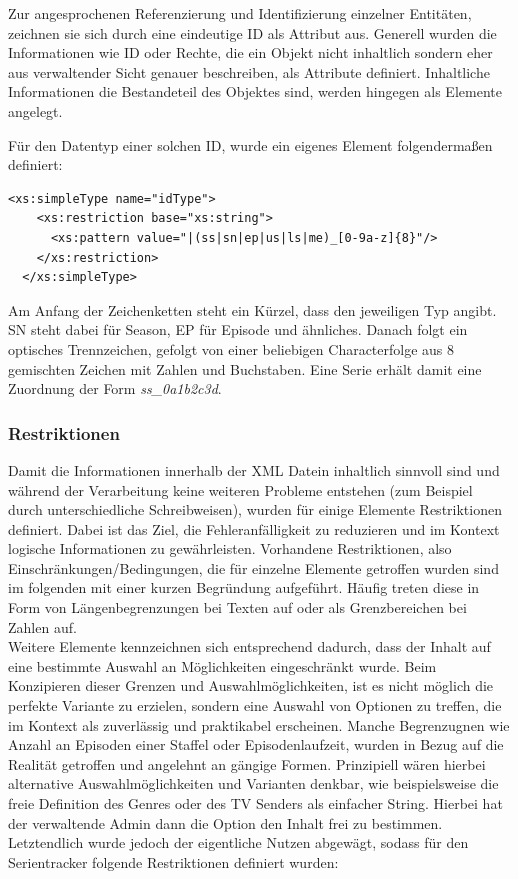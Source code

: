 \parskip 12pt
\parindent 0pt
Zur angesprochenen Referenzierung und Identifizierung einzelner Entitäten, zeichnen sie sich durch eine eindeutige ID als Attribut aus. Generell wurden die Informationen wie ID oder Rechte, die ein Objekt nicht inhaltlich sondern eher aus verwaltender Sicht genauer beschreiben, als Attribute definiert. Inhaltliche Informationen die Bestandeteil des Objektes sind, werden hingegen als Elemente angelegt.

Für den Datentyp einer solchen ID, wurde ein eigenes Element folgendermaßen definiert:
\begin{lstlisting}[label=xsd-definition,caption= Definition der globalen ID's]
  <xs:simpleType name="idType">
    <xs:restriction base="xs:string">
      <xs:pattern value="|(ss|sn|ep|us|ls|me)_[0-9a-z]{8}"/>
    </xs:restriction>
  </xs:simpleType>
\end{lstlisting}

Am Anfang der Zeichenketten steht ein Kürzel, dass den jeweiligen Typ angibt. SN steht dabei für Season, EP für Episode und ähnliches. Danach folgt ein optisches Trennzeichen, gefolgt von einer beliebigen Characterfolge aus 8 gemischten Zeichen mit Zahlen und Buchstaben. Eine Serie erhält damit eine Zuordnung der Form \textit{ss\_0a1b2c3d}.



\subsubsection{Restriktionen}
Damit die Informationen innerhalb der XML Datein inhaltlich sinnvoll sind und während der Verarbeitung keine weiteren Probleme entstehen (zum Beispiel durch unterschiedliche Schreibweisen), wurden für einige Elemente Restriktionen definiert.
Dabei ist das Ziel, die Fehleranfälligkeit zu reduzieren und im Kontext logische Informationen zu gewährleisten. Vorhandene Restriktionen, also Einschränkungen/Bedingungen, die für einzelne Elemente getroffen wurden sind im folgenden mit einer kurzen Begründung aufgeführt. Häufig treten diese in Form von Längenbegrenzungen bei Texten auf oder als Grenzbereichen bei Zahlen auf.\\
Weitere Elemente kennzeichnen sich entsprechend dadurch, dass der Inhalt auf eine bestimmte Auswahl an Möglichkeiten eingeschränkt wurde. Beim Konzipieren dieser Grenzen und Auswahlmöglichkeiten, ist es nicht möglich die perfekte Variante zu erzielen, sondern eine Auswahl von Optionen zu treffen, die im Kontext als zuverlässig und praktikabel erscheinen. Manche Begrenzugnen wie Anzahl an Episoden einer Staffel oder Episodenlaufzeit, wurden in Bezug auf die Realität getroffen und angelehnt an gängige Formen. Prinzipiell wären hierbei  alternative Auswahlmöglichkeiten und Varianten denkbar, wie beispielsweise die freie Definition des Genres oder des TV Senders als einfacher String. Hierbei hat der verwaltende Admin dann die Option den Inhalt frei zu bestimmen. Letztendlich wurde jedoch der eigentliche Nutzen abgewägt, sodass für den Serientracker folgende Restriktionen definiert wurden:

